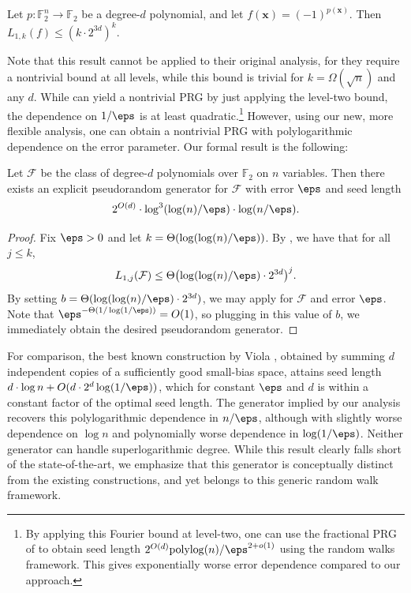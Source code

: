 \begin{proposition}
\label{prop:f2bound}
Let $p\colon\mathbb{F}_2^n\to \mathbb{F}_2$ be a degree-$d$ polynomial, and let $f(\mathbf{x})=(-1)^{p(\mathbf{x})}$. Then $L_{1,k}(f)\leq (k\cdot 2^{3d})^k$.
\end{proposition}
Note that this result cannot be applied to their original analysis, for they require a nontrivial bound at all levels, while this bound is trivial for $k=\Omega(\sqrt{n})$ and any $d$. While   can yield a nontrivial PRG by just applying the level-two bound, the dependence on $1/\eps$ is at least quadratic.\footnote{By applying this Fourier bound at level-two, one can use the fractional PRG of \cite{CHLT} to obtain seed length $2^{O(d)}\mathrm{polylog}(n)/\eps^{2+o(1)}$ using the random walks framework. This gives exponentially worse error dependence compared to our approach.} However, using our new, more flexible analysis, one can obtain a nontrivial PRG with polylogarithmic dependence on the error parameter. Our formal result is the following:

\begin{THM}
Let $\mathcal{F}$ be the class of degree-$d$ polynomials over $\mathbb{F}_2$ on $n$ variables. Then there exists an explicit pseudorandom generator for $\mathcal{F}$ with error $\eps$ and seed length
\begin{equation*}
    2^{O(d)}\cdot \log^3(\log(n)/\eps)\cdot \log(n/\eps).
\end{equation*}
\end{THM}
\begin{proof}
Fix $\eps>0$ and let $k=\Theta(\log(\log(n)/\eps))$. By   , we have that for all $j\leq k$,
\begin{equation*}
    L_{1,j}(\mathcal{F})\leq \Theta\bigl(\log(\log(n)/\eps)\cdot 2^{3d} \bigr)^j.
\end{equation*}
By setting $b=\Theta(\log(\log(n)/\eps)\cdot 2^{3d})$, we may apply    for $\mathcal{F}$ and error $\eps$. Note that $\eps^{-\Theta(1/\log(1/\eps))}=O(1)$, so plugging in this value of $b$, we immediately obtain the desired pseudorandom generator.
\end{proof}
For comparison, the best known construction by Viola \cite{viola2009sum}, obtained by summing $d$ independent copies of a sufficiently good small-bias space, attains seed length $d\cdot \log n + O(d\cdot 2^d \log(1/\eps))$, which for constant $\eps$ and $d$ is within a constant factor of the optimal seed length.  The generator implied by our analysis recovers this polylogarithmic dependence in $n/\eps$, although with slightly worse dependence on $\log n$ and polynomially worse dependence in $\log(1/\eps)$. Neither generator can handle superlogarithmic degree. While this result clearly falls short of the state-of-the-art, we emphasize that this generator is conceptually distinct from the existing constructions, and yet belongs to this generic random walk framework.

